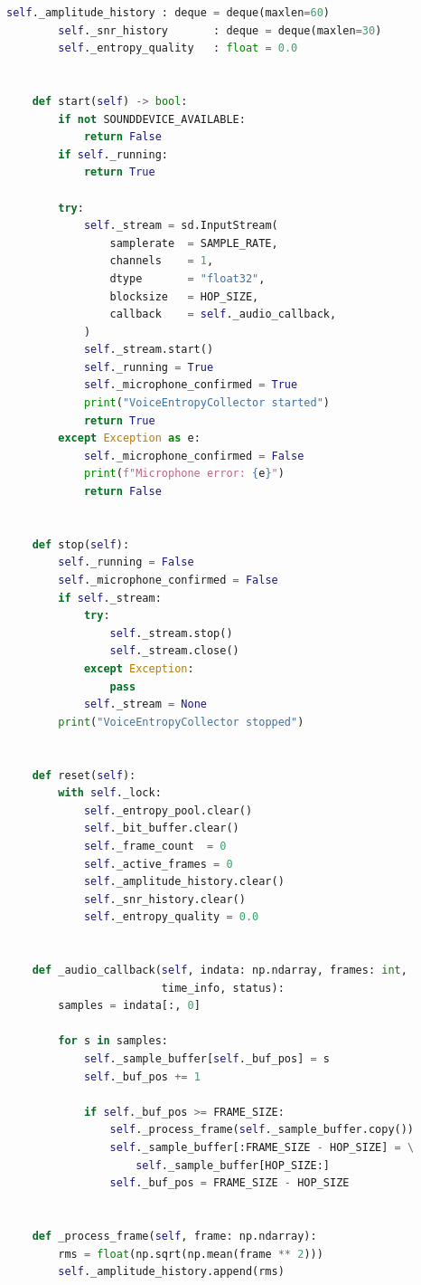 \documentclass[14pt, a4paper]{extreport}
\begin{document}
\begin{lstlisting}[language=Python, caption={Файл VoiceEntropy.py}, basicstyle=\ttfamily\footnotesize, breaklines=true]
        self._amplitude_history : deque = deque(maxlen=60)
        self._snr_history       : deque = deque(maxlen=30)
        self._entropy_quality   : float = 0.0


    def start(self) -> bool:
        if not SOUNDDEVICE_AVAILABLE:
            return False
        if self._running:
            return True

        try:
            self._stream = sd.InputStream(
                samplerate  = SAMPLE_RATE,
                channels    = 1,
                dtype       = "float32",
                blocksize   = HOP_SIZE,
                callback    = self._audio_callback,
            )
            self._stream.start()
            self._running = True
            self._microphone_confirmed = True
            print("VoiceEntropyCollector started")
            return True
        except Exception as e:
            self._microphone_confirmed = False
            print(f"Microphone error: {e}")
            return False


    def stop(self):
        self._running = False
        self._microphone_confirmed = False
        if self._stream:
            try:
                self._stream.stop()
                self._stream.close()
            except Exception:
                pass
            self._stream = None
        print("VoiceEntropyCollector stopped")


    def reset(self):
        with self._lock:
            self._entropy_pool.clear()
            self._bit_buffer.clear()
            self._frame_count  = 0
            self._active_frames = 0
            self._amplitude_history.clear()
            self._snr_history.clear()
            self._entropy_quality = 0.0


    def _audio_callback(self, indata: np.ndarray, frames: int,
                        time_info, status):
        samples = indata[:, 0]

        for s in samples:
            self._sample_buffer[self._buf_pos] = s
            self._buf_pos += 1

            if self._buf_pos >= FRAME_SIZE:
                self._process_frame(self._sample_buffer.copy())
                self._sample_buffer[:FRAME_SIZE - HOP_SIZE] = \
                    self._sample_buffer[HOP_SIZE:]
                self._buf_pos = FRAME_SIZE - HOP_SIZE


    def _process_frame(self, frame: np.ndarray):
        rms = float(np.sqrt(np.mean(frame ** 2)))
        self._amplitude_history.append(rms)


\end{lstlisting}
\end{document}
